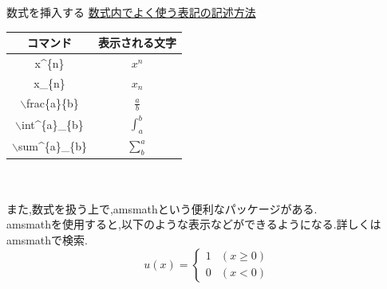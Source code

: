 \documentclass[dvipdfmx]{beamer}
\newcommand{\tbs}{$\backslash$}
\begin{document}
  \begin{frame}{数式を挿入する}
    \underline{数式内でよく使う表記の記述方法}\\
    \scriptsize
    \begin{table}[h]
      \centering
      \begin{tabular}{|c|c|}\hline
        コマンド&表示される文字 \\ \hline
        x\^{}\{n\}&$x^{n}$ \\ \hline
        x\_\{n\}&$x_{n}$ \\ \hline
        \tbs frac\{a\}\{b\} & $\frac{a}{b}$ \\ \hline
        \tbs int\^{}\{a\}\_\{b\} & $\int_{a}^{b}$ \\ \hline
        \tbs sum\^{}\{a\}\_\{b\} & $\sum^{a}_{b}$ \\ \hline
      \end{tabular}
    \end{table}
    ~\\~\\
    また,数式を扱う上で,amsmathという便利なパッケージがある.\\
    amsmathを使用すると,以下のような表示などができるようになる.詳しくはamsmathで検索.\\
    \[
    u(x)=
    \begin{cases}
      1 & (x\ge0)\\
      0 & (x<0)
    \end{cases}
    \]
  \end{frame}
\end{document}
